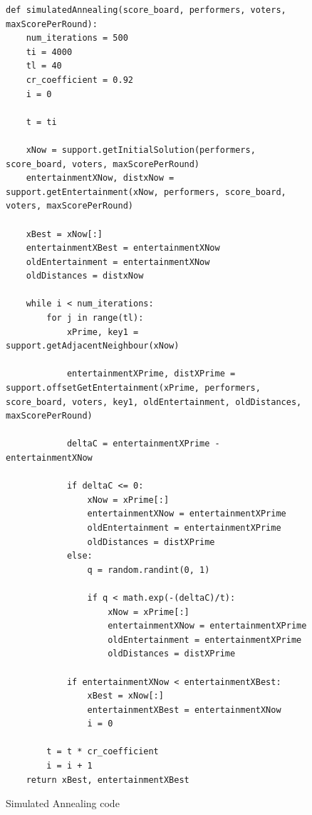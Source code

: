 \documentclass[12pt]{report}
\begin{document}
\begin{figure}[H]
\caption{Simulated Annealing code}
\label{simAnnealingCode}
\begin{lstlisting}
def simulatedAnnealing(score_board, performers, voters, maxScorePerRound):
    num_iterations = 500
    ti = 4000
    tl = 40
    cr_coefficient = 0.92
    i = 0
    
    t = ti
    
    xNow = support.getInitialSolution(performers, score_board, voters, maxScorePerRound)
    entertainmentXNow, distxNow = support.getEntertainment(xNow, performers, score_board, voters, maxScorePerRound)
    
    xBest = xNow[:]
    entertainmentXBest = entertainmentXNow
    oldEntertainment = entertainmentXNow
    oldDistances = distxNow

    while i < num_iterations:
        for j in range(tl):
            xPrime, key1 = support.getAdjacentNeighbour(xNow)

            entertainmentXPrime, distXPrime = support.offsetGetEntertainment(xPrime, performers, score_board, voters, key1, oldEntertainment, oldDistances, maxScorePerRound)
            
            deltaC = entertainmentXPrime - entertainmentXNow

            if deltaC <= 0:
                xNow = xPrime[:]
                entertainmentXNow = entertainmentXPrime
                oldEntertainment = entertainmentXPrime
                oldDistances = distXPrime
            else:
                q = random.randint(0, 1)

                if q < math.exp(-(deltaC)/t):
                    xNow = xPrime[:]
                    entertainmentXNow = entertainmentXPrime
                    oldEntertainment = entertainmentXPrime
                    oldDistances = distXPrime

            if entertainmentXNow < entertainmentXBest:
                xBest = xNow[:]
                entertainmentXBest = entertainmentXNow
                i = 0
        
        t = t * cr_coefficient
        i = i + 1
    return xBest, entertainmentXBest\end{lstlisting}
\end{figure}
\end{document}

